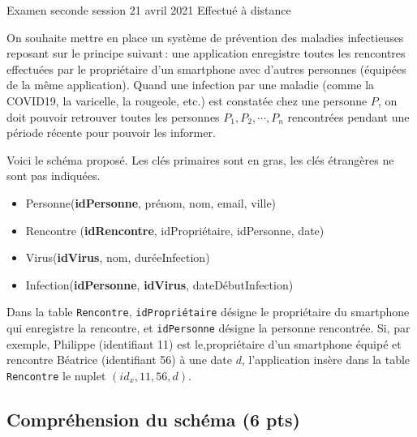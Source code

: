 %
{Examen seconde session 21 avril 2021}%
{Effectué à distance}%


On souhaite mettre en place un système de prévention des maladies infectieuses
reposant sur le principe suivant\,: une application  
enregistre toutes les rencontres effectuées par le propriétaire
d'un smartphone avec d'autres personnes (équipées de la même application). 
Quand une infection par une maladie (comme la COVID19, la  varicelle, la rougeole, etc.)
est constatée chez une personne $P$, on doit pouvoir retrouver toutes  les
personnes $P_1, P_2, \cdots, P_n$ rencontrées pendant une période récente pour pouvoir
les informer.

Voici le schéma proposé. Les clés primaires sont en gras, les clés étrangères ne sont pas indiquées.

\begin{itemize}
\item Personne(\textbf{idPersonne},  prénom, nom, email, ville)
\item Rencontre (\textbf{idRencontre}, idPropriétaire, idPersonne, date)
\item Virus(\textbf{idVirus}, nom, duréeInfection)
\item Infection(\textbf{idPersonne}, \textbf{idVirus}, dateDébutInfection)
\end{itemize}

Dans la table \texttt{Rencontre}, \texttt{idPropriétaire} désigne le propriétaire
du smartphone qui enregistre la rencontre, et  \texttt{idPersonne} désigne
la personne rencontrée. Si, par exemple, Philippe (identifiant 11) est le,propriétaire
d'un smartphone équipé et rencontre Béatrice
(identifiant 56) à une date $d$, 
l'application insère dans la table 
\texttt{Rencontre} le nuplet 
$(id_x, 11, 56, d)$.  

\subsection*{Compréhension du schéma (6 pts)}

